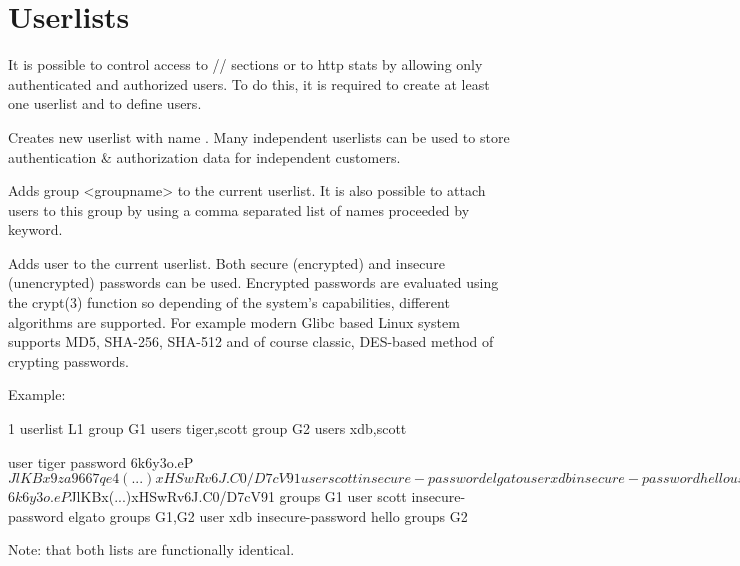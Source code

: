 
\section{Userlists}

It is possible to control access to 
// sections or to
http stats by allowing only authenticated and authorized users. To do this,
it is required to create at least one userlist and to define users.

\begin{keywords}

 

  Creates new userlist with name . Many independent userlists can be
  used to store authentication \& authorization data for independent customers.

 

  Adds group <groupname> to the current userlist. It is also possible to
  attach users to this group by using a comma separated list of names
  proceeded by  keyword.

 

  Adds user  to the current userlist. Both secure (encrypted) and
  insecure (unencrypted) passwords can be used. Encrypted passwords are
  evaluated using the crypt(3) function so depending of the system's
  capabilities, different algorithms are supported. For example modern Glibc
  based Linux system supports MD5, SHA-256, SHA-512 and of course classic,
  DES-based method of crypting passwords.


  Example:
\begin{listing}{1}
userlist L1
  group G1 users tiger,scott
  group G2 users xdb,scott

  user tiger password $6$k6y3o.eP$JlKBx9za9667qe4(...)xHSwRv6J.C0/D7cV91
  user scott insecure-password elgato
  user xdb insecure-password hello

userlist L2
  group G1
  group G2

  user tiger password $6$k6y3o.eP$JlKBx(...)xHSwRv6J.C0/D7cV91 groups G1
  user scott insecure-password elgato groups G1,G2
  user xdb insecure-password hello groups G2
\end{listing}

\note Note:
that both lists are functionally identical.

\end{keywords}

